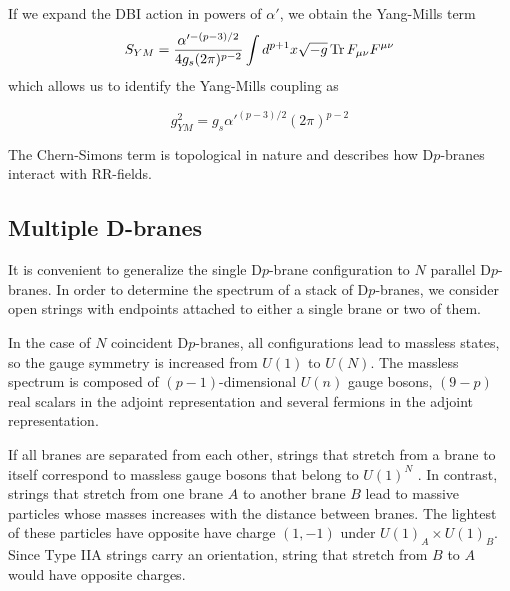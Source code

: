 %
%
%

If we expand the DBI action in powers of $\alpha'$, we obtain the Yang-Mills term
\begin{equation}
  S_{YM} = \frac{\alpha'^{-(p-3)/2}}{4g_s (2\pi)^{p-2}} \int d^{p+1} x \sqrt {-g} \Tr F_{\mu\nu} F^{\mu\nu}
\end{equation}
which allows us to identify the Yang-Mills coupling as 

\begin{equation}
g^2_{YM} = g_s \alpha'^{(p-3)/2}(2\pi)^{p-2}
\end{equation}

The Chern-Simons term is topological in nature and describes how D$p$-branes interact with RR-fields.


\subsection{Multiple D-branes}

It is convenient to generalize the single D$p$-brane configuration to $N$ parallel D$p$-branes.
In order to determine the spectrum of a stack of D$p$-branes, we consider open strings with endpoints 
attached to either a single brane or two of them.

In the case of $N$ coincident D$p$-branes, all configurations lead to massless states, so the 
gauge symmetry is increased from $U(1)$ to $U(N)$.
The massless spectrum is composed of $(p-1)$-dimensional $U(n)$ gauge bosons, $(9-p)$ real
scalars in the adjoint representation and several fermions in the adjoint representation.

If all branes are separated from each other, strings that stretch from a brane to itself correspond to massless gauge bosons that belong to $U(1)^N$ .
In contrast, strings that stretch from one brane $A$ to another brane $B$ lead to massive particles whose
masses increases with the distance between branes.
The lightest of these particles have opposite have charge $(1,-1)$ under $U(1)_A \times U(1)_B$.
Since Type IIA strings carry an orientation, string that stretch from $B$ to $A$ would have opposite charges.

